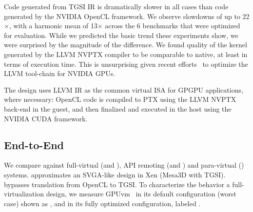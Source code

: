 Code generated from TGSI IR is dramatically slower in all cases than code
generated by the NVIDIA OpenCL framework. We observe slowdowns of up to 22$
\times$, with a harmonic mean of 13$\times$ across the 6 benchmarks that were
optimized for evaluation.
While we
predicted the basic trend these experiments show, we were surprised by the
magnitude of the difference. We found quality of the kernel generated by the
LLVM NVPTX compiler to be comparable to native, at least in terms of execution
time. This is unsurprising given recent efforts~\cite{gpucc} to optimize the
LLVM tool-chain for NVIDIA GPUs.

The \trillium design uses LLVM IR as the common virtual ISA for GPGPU applications,
where necessary: OpenCL code is compiled to PTX using the LLVM NVPTX back-end in the guest,
and then finalized and executed in the host using the NVIDIA CUDA framework.



\subsection{End-to-End}


We compare \trillium against full-virtual (\gpuvmdef and \gpuvmopt),
API remoting (\apigpu and \apicpu) and para-virtual (\trxc) systems.
\trxc approximates an SVGA-like design in Xen (Mesa3D with TGSI). \trxd
bypasses translation from OpenCL to TGSI.
To characterize the behavior a full-virtual\-ization design, we measure
GPUvm~\cite{GPUvm} in its default configuration (worst case) shown as \gpuvmdef,
and in its fully optimized configuration, labeled \gpuvmopt.


